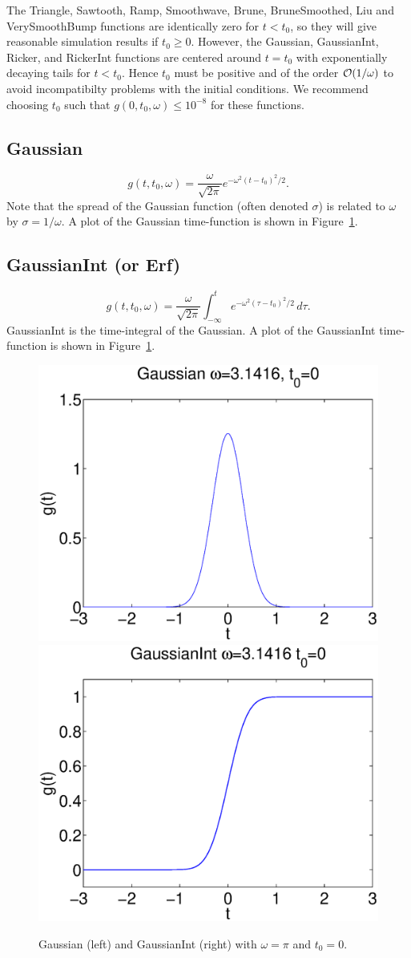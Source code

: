 \documentclass[11pt]{report}
\begin{document}
The Triangle, Sawtooth, Ramp, Smoothwave, Brune, BruneSmoothed, Liu and VerySmoothBump functions are
identically zero for $t<t_0$, so they will give reasonable simulation results if $t_0\geq
0$. However, the Gaussian, GaussianInt, Ricker, and RickerInt functions are centered around $t=t_0$
with exponentially decaying tails for $t<t_0$. Hence $t_0$ must be positive and of the order ${\cal
  O}(1/\omega)$ to avoid incompatibilty problems with the initial conditions. We recommend choosing
$t_0$ such that $g(0,t_0,\omega) \leq 10^{-8}$ for these functions.

\subsection{Gaussian}\label{gaussian}
  \[
  g(t,t_0,\omega) = \dfrac{\omega}{\sqrt{2 \pi}} e^{-\omega^2 (t - t_0)^2 /2}.
  \] 
Note that the spread of the Gaussian function (often denoted $\sigma$) is related to $\omega$ by
$\sigma = 1 / \omega$. A plot of the Gaussian time-function is shown in Figure~\ref{fig:gaussians}.

\subsection{GaussianInt (or Erf)}\label{gaussianint}
\[
g(t,t_0,\omega) = \dfrac{\omega}{\sqrt{2 \pi}} \int_{-\infty}^t e^{-\omega^2 (\tau - t_0)^2/2}\,d\tau.
\] 
GaussianInt is the time-integral of the Gaussian. A plot of the
GaussianInt time-function is shown in Figure~\ref{fig:gaussians}.
\begin{figure}
\begin{centering}
  \includegraphics[width=0.4\linewidth]{f1-gaussian.ps}
  \includegraphics[width=0.4\linewidth]{f2-gaussianint.ps}
  \caption{Gaussian (left) and GaussianInt (right) with $\omega=\pi$ and $t_0=0$.}
  \label{fig:gaussians}
\end{centering}
\end{figure}  
%
\end{document}
